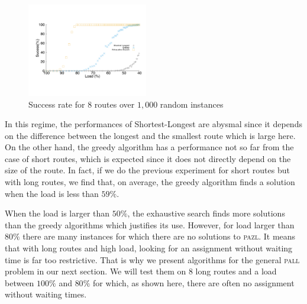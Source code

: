\documentclass[10pt, conference, letterpaper]{IEEEtran}
\newcommand\pazl{\textsc{pazl}\xspace}
\newcommand\pall{\textsc{pall}\xspace}
\begin{document}
\begin{figure}[h]

       \begin{center}
      \includegraphics[width=0.47\textwidth]{echec_longues.pdf}
      \end{center}
       
      \caption{Success rate for $8$ routes over $1,000$ random instances}\label{fig:long}
     \end{figure}
      
      In this regime, the performances of Shortest-Longest are abysmal since it depends on the difference between the longest and the smallest route which is large here. On the other hand, the greedy algorithm has a performance not so far from the case of short routes, which is expected since it does not directly depend on the size of the route. In fact, if we do the previous experiment 
      for short routes but with long routes, we find that, on average, the greedy algorithm finds a solution when the load is less than $59\%$.
      
      When the load is larger than $50\%$, the exhaustive search finds more solutions than the greedy algorithms which justifies its use. However, for load larger than $80\%$ there are many instances for which there are no solutions to \pazl.
      It means that with long routes and high load, looking for an assignment without waiting time is far too restrictive. That is why we present algorithms for the general \pall problem in our next section. We will test them on $8$ long routes and a load between $100\%$ and $80\%$ for which, as shown here, there are often no assignment without waiting times.
      
\end{document}
